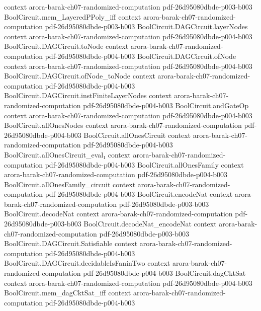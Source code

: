 \begin{theorem}
  {context}
  {arora-barak-ch07-randomized-computation}
  {pdf-26d95080dbde-p003-b003}
\proofstep
  {BoolCircuit.mem_LayeredPPoly_iff}
  {context}
  {arora-barak-ch07-randomized-computation}
  {pdf-26d95080dbde-p003-b003}
\proofstep
  {BoolCircuit.DAGCircuit.layerNodes}
  {context}
  {arora-barak-ch07-randomized-computation}
  {pdf-26d95080dbde-p004-b003}
\proofstep
  {BoolCircuit.DAGCircuit.toNode}
  {context}
  {arora-barak-ch07-randomized-computation}
  {pdf-26d95080dbde-p004-b003}
\proofstep
  {BoolCircuit.DAGCircuit.ofNode}
  {context}
  {arora-barak-ch07-randomized-computation}
  {pdf-26d95080dbde-p004-b003}
\proofstep
  {BoolCircuit.DAGCircuit.ofNode_toNode}
  {context}
  {arora-barak-ch07-randomized-computation}
  {pdf-26d95080dbde-p004-b003}
\proofstep
  {BoolCircuit.DAGCircuit.instFiniteLayerNodes}
  {context}
  {arora-barak-ch07-randomized-computation}
  {pdf-26d95080dbde-p004-b003}
\proofstep
  {BoolCircuit.andGateOp}
  {context}
  {arora-barak-ch07-randomized-computation}
  {pdf-26d95080dbde-p004-b003}
\proofstep
  {BoolCircuit.allOnesNodes}
  {context}
  {arora-barak-ch07-randomized-computation}
  {pdf-26d95080dbde-p004-b003}
\proofstep
  {BoolCircuit.allOnesCircuit}
  {context}
  {arora-barak-ch07-randomized-computation}
  {pdf-26d95080dbde-p004-b003}
\proofstep
  {BoolCircuit.allOnesCircuit_eval₁}
  {context}
  {arora-barak-ch07-randomized-computation}
  {pdf-26d95080dbde-p004-b003}
\proofstep
  {BoolCircuit.allOnesFamily}
  {context}
  {arora-barak-ch07-randomized-computation}
  {pdf-26d95080dbde-p004-b003}
\proofstep
  {BoolCircuit.allOnesFamily_circuit}
  {context}
  {arora-barak-ch07-randomized-computation}
  {pdf-26d95080dbde-p004-b003}
\proofstep
  {BoolCircuit.encodeNat}
  {context}
  {arora-barak-ch07-randomized-computation}
  {pdf-26d95080dbde-p003-b003}
\proofstep
  {BoolCircuit.decodeNat}
  {context}
  {arora-barak-ch07-randomized-computation}
  {pdf-26d95080dbde-p003-b003}
\proofstep
  {BoolCircuit.decodeNat_encodeNat}
  {context}
  {arora-barak-ch07-randomized-computation}
  {pdf-26d95080dbde-p003-b003}
\proofstep
  {BoolCircuit.DAGCircuit.Satisfiable}
  {context}
  {arora-barak-ch07-randomized-computation}
  {pdf-26d95080dbde-p004-b003}
\proofstep
  {BoolCircuit.DAGCircuit.decidableIsFaninTwo}
  {context}
  {arora-barak-ch07-randomized-computation}
  {pdf-26d95080dbde-p004-b003}
\proofstep
  {BoolCircuit.dagCktSat}
  {context}
  {arora-barak-ch07-randomized-computation}
  {pdf-26d95080dbde-p004-b003}
\proofstep
  {BoolCircuit.mem_dagCktSat_iff}
  {context}
  {arora-barak-ch07-randomized-computation}
  {pdf-26d95080dbde-p004-b003}

\end{theorem}
